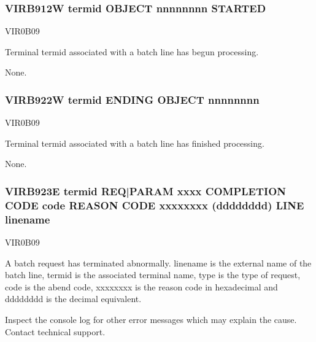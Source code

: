 \documentclass[letterpaper,10pt,english]{sphinxmanual}
\begin{document}
\subsubsection{VIRB912W termid OBJECT nnnnnnnn STARTED}
\label{\detokenize{messages:virb912w-termid-object-nnnnnnnn-started}}\begin{description}
\sphinxAtStartPar
VIR0B09

\sphinxAtStartPar
Terminal termid associated with a batch line has begun processing.

\sphinxAtStartPar
None.

\end{description}


\subsubsection{VIRB922W termid ENDING OBJECT nnnnnnnn}
\label{\detokenize{messages:virb922w-termid-ending-object-nnnnnnnn}}\begin{description}
\sphinxAtStartPar
VIR0B09

\sphinxAtStartPar
Terminal termid associated with a batch line has finished processing.

\sphinxAtStartPar
None.

\end{description}


\subsubsection{VIRB923E termid REQ|PARAM xxxx COMPLETION CODE code REASON CODE xxxxxxxx (dddddddd) LINE linename}
\label{\detokenize{messages:virb923e-termid-req-param-xxxx-completion-code-code-reason-code-xxxxxxxx-dddddddd-line-linename}}\begin{description}
\sphinxAtStartPar
VIR0B09

\sphinxAtStartPar
A batch request has terminated abnormally. linename is the external name of the batch line, termid is the associated terminal name, type is the type of request, code is the abend code, xxxxxxxx is the reason code in hexadecimal and dddddddd is the decimal equivalent.

\sphinxAtStartPar
Inspect the console log for other error messages which may explain the cause. Contact technical support.

\end{description}
\end{document}
